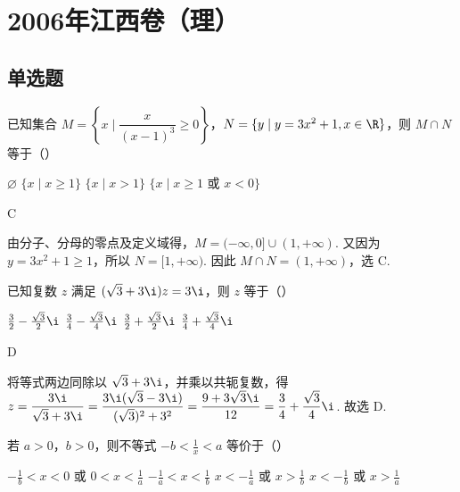 \chapter{2006年江西卷（理）}
\section{单选题}
\begin{problem}
已知集合 \(M = \left\{x \mid \dfrac{x}{(x - 1)^3} \geqslant 0\right\}\)，\(N = \{y \mid y = 3x^2 + 1, x \in \R\}\)，则 \(M \cap N\) 等于（\quad）

\choices
    {\(\varnothing\)}
    {\(\{x\mid x\geqslant 1\}\)}
    {\(\{x\mid x>1\}\)}
    {\(\{x\mid x\geqslant 1 \text{\ 或\ } x<0\}\)}
\end{problem}

\begin{answer}
C
\end{answer}

\begin{solution}
由分子、分母的零点及定义域得，\(M=(-\infty,0]\cup(1,+\infty)\). 又因为 \(y=3x^2+1\geqslant1\)，所以 \(N=[1,+\infty)\). 因此 \(M\cap N=(1,+\infty)\)，选 C.
\end{solution}

\begin{problem}
已知复数 \(z\) 满足 \((\sqrt{3} + 3\i)z = 3\i\)，则 \(z\) 等于（\quad）

\choices
    {\(\frac{3}{2} - \frac{\sqrt{3}}{2}\i\)}
    {\(\frac{3}{4} - \frac{\sqrt{3}}{4}\i\)}
    {\(\frac{3}{2} + \frac{\sqrt{3}}{2}\i\)}
    {\(\frac{3}{4} + \frac{\sqrt{3}}{4}\i\)}
\end{problem}

\begin{answer}
D
\end{answer}

\begin{solution}
将等式两边同除以 \(\sqrt{3}+3\i\)，并乘以共轭复数，得
\(z=\dfrac{3\i}{\sqrt{3}+3\i}=\dfrac{3\i(\sqrt{3}-3\i)}{(\sqrt{3})^2+3^2}=\dfrac{9+3\sqrt{3}\i}{12}=\dfrac{3}{4}+\dfrac{\sqrt{3}}{4}\i\). 故选 D.
\end{solution}

\begin{problem}
若 \(a > 0\)，\(b > 0\)，则不等式 \(-b < \frac{1}{x} < a\) 等价于（\quad）

\choices
    {\(-\frac{1}{b} < x < 0 \text{\ 或\ } 0 < x < \frac{1}{a}\)}
    {\(-\frac{1}{a} < x < \frac{1}{b}\)}
    {\(x < -\frac{1}{a}\) 或 \(x > \frac{1}{b}\)}
    {\(x < -\frac{1}{b}\) 或 \(x > \frac{1}{a}\)}
\end{problem}

